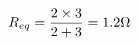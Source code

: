 \documentclass[preview]{standalone}
\begin{document}
\begin{align*}
\special{dvisvgm:raw <g id='unique000'>}R_{eq} = \frac{2 \times 3}{2 + 3} = 1.2\Omega\special{dvisvgm:raw </g>}
\end{align*}
\end{document}
